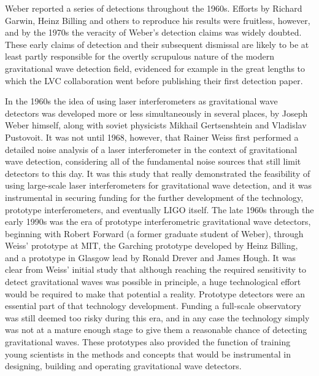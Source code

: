 Weber reported a series of detections throughout the 1960s. Efforts by Richard Garwin, Heinz Billing and others 
to reproduce his results were fruitless, however, and by the 1970s the veracity of Weber's detection claims was widely doubted. 
These early claims of detection and their subsequent dismissal are likely to be at least partly responsible for the 
overtly scrupulous nature of the modern gravitational wave detection field, evidenced for example in the great lengths to which 
the LVC collaboration went before publishing their first detection paper.

In the 1960s the idea of using laser interferometers as gravitational wave detectors was developed more or less simultaneously 
in several places, by Joseph Weber himself, along with soviet physicists Mikhail Gertsenshtein and Vladislav Pustovoit. 
It was not until 1968, however, that Rainer Weiss first performed a detailed noise analysis of a laser interferometer in the context 
of gravitational wave detection, considering all of the fundamental noise sources that still limit detectors to this day. 
It was this study that really demonstrated the feasibility of using large-scale laser interferometers for gravitational wave detection, and 
it was instrumental in securing funding for the further development of the technology, prototype interferometers, and eventually LIGO itself. 
The late 1960s through the early 1990s was the era of prototype interferometric gravitational wave detectors, beginning with 
Robert Forward (a former graduate student of Weber), through Weiss' prototype at MIT, the Garching prototype developed by 
Heinz Billing, and a prototype in Glasgow lead by Ronald Drever and James Hough. 
It was clear from Weiss' initial 
study that although reaching the required sensitivity to detect gravitational waves was possible in principle, a huge technological effort would 
be required to make that potential a reality. 
Prototype detectors were an essential part of that technology development. Funding a full-scale 
observatory was still deemed too risky during this era, and in any case the technology simply was not at a mature enough stage to give them 
a reasonable chance of detecting gravitational waves. These prototypes also provided the function 
of training young scientists in the methods and concepts that would be instrumental in 
designing, building and operating gravitational wave detectors. 

